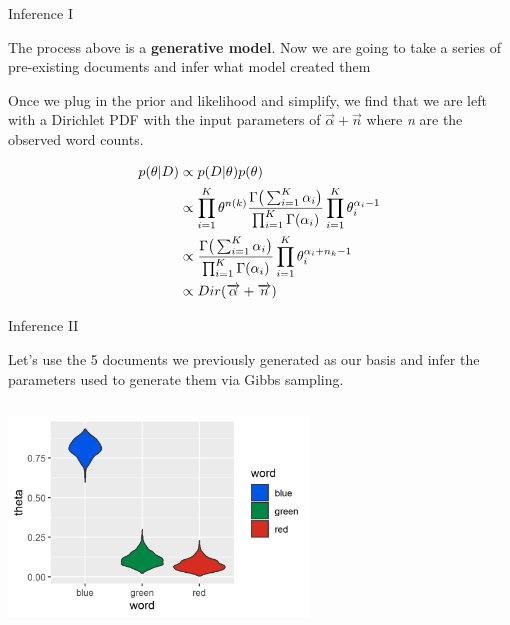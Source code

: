 \documentclass[
  ignorenonframetext,
]{beamer}
\begin{document}
\begin{frame}{Inference I}
\protect\hypertarget{inference-i}{}

\footnotesize

The process above is a \textbf{generative model}. Now we are going to
take a series of pre-existing documents and infer what model created
them

Once we plug in the prior and likelihood and simplify, we find that we
are left with a Dirichlet PDF with the input parameters of
\(\overrightarrow{\alpha} + \overrightarrow{n}\) where \emph{n} are the
observed word counts.

\begin{equation}
\begin{aligned}
p(\theta|D) &\propto p(D|\theta)p(\theta)\\
&\propto \prod _{i=1}^{K}\theta^{n(k)} { 
  {\Gamma {\bigl (}\sum _{i=1}^{K}\alpha _{i}{\bigr )}}
  \over{\prod _{i=1}^{K}\Gamma (\alpha _{i})}
}
\prod _{i=1}^{K}\theta_{i}^{\alpha _{i}-1} \\
&\propto{ 
  {\Gamma {\bigl (}\sum _{i=1}^{K}\alpha _{i}{\bigr )}}
  \over{\prod _{i=1}^{K}\Gamma (\alpha _{i})}
}\prod _{i=1}^{K}\theta_{i}^{\alpha _{i}+n_{k}-1} \\
&\propto Dir(\overrightarrow{\alpha} + \overrightarrow{n})
\end{aligned}
\end{equation}

\end{frame}

\begin{frame}{Inference II}
\protect\hypertarget{inference-ii}{}

Let's use the 5 documents we previously generated as our basis and infer
the parameters used to generate them via Gibbs sampling.

\begin{center}\includegraphics[width=8cm,height=6cm]{figures/unigramInference10} \end{center}

\end{frame}
\end{document}
